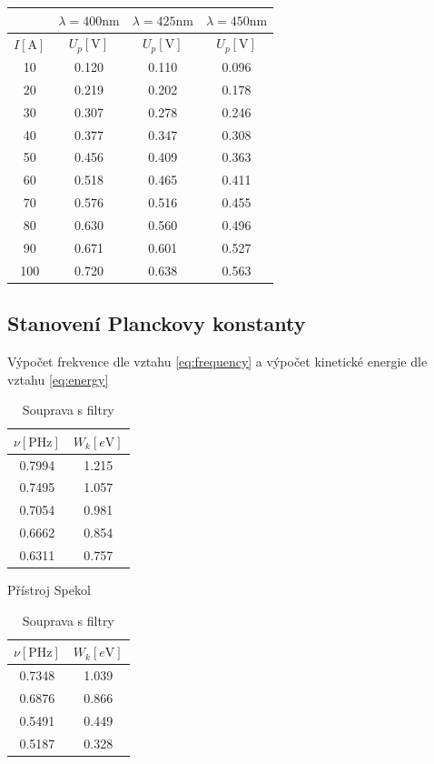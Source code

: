 \documentclass[titlepage]{article}
\begin{document}
\begin{table}[!htb]
  \centering
  \begin{tabular}{c||c|c|c}
    & $\lambda = 400 \si{\nano\meter}$ & $\lambda = 425 \si{\nano\meter}$ & $\lambda = 450 \si{\nano\meter}$ \\\hline
    $ I [\si{\ampere}]$ & $ U_p [\si{\volt}]$ & $ U_p [\si{\volt}]$ & $ U_p [\si{\volt}]$ \\\hline\hline
    10 & 0.120 & 0.110 & 0.096 \\\hline
    20 & 0.219 & 0.202 & 0.178 \\\hline
    30 & 0.307 & 0.278 & 0.246 \\\hline
    40 & 0.377 & 0.347 & 0.308 \\\hline
    50 & 0.456 & 0.409 & 0.363 \\\hline
    60 & 0.518 & 0.465 & 0.411 \\\hline
    70 & 0.576 & 0.516 & 0.455 \\\hline
    80 & 0.630 & 0.560 & 0.496 \\\hline
    90 & 0.671 & 0.601 & 0.527 \\\hline
    100 & 0.720 & 0.638 & 0.563
  \end{tabular}

\end{table}

\subsection{Stanovení Planckovy konstanty}
Výpočet frekvence dle vztahu \eqref{eq:frequency} a výpočet kinetické energie dle vztahu \eqref{eq:energy}
\begin{table}[!htb]
    \begin{minipage}{.5\linewidth}
      \centering
        \begin{tabular}{c||c}
           $\nu [\si{\peta\hertz}]$ & $W_k [\si{e\volt}]$\\ \hline \hline
           0.7994 & 1.215 \\ \hline
           0.7495 & 1.057 \\ \hline
           0.7054 & 0.981 \\ \hline
           0.6662 & 0.854 \\ \hline
           0.6311 & 0.757
        \end{tabular}
        \caption{Přístroj Spekol}
    \end{minipage}%
    \begin{minipage}{.5\linewidth}
      \centering
        \begin{tabular}{c||c}
           $\nu [\si{\peta\hertz}]$ & $W_k [\si{e\volt}]$\\ \hline \hline
           0.7348 & 1.039\\ \hline
           0.6876 & 0.866\\ \hline
           0.5491 & 0.449\\ \hline
           0.5187 & 0.328
        \end{tabular}
        \caption{Souprava s filtry}
    \end{minipage}
\end{table}
\end{document}
